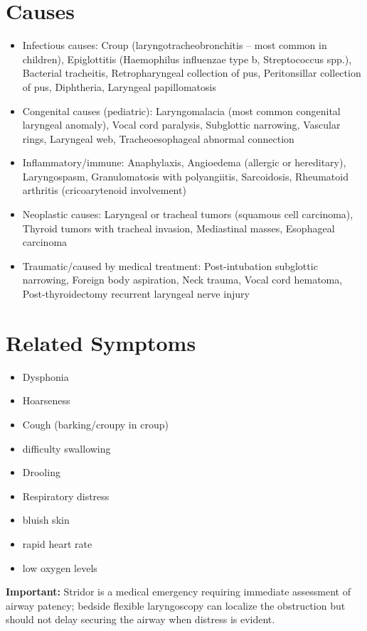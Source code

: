 \section*{Causes}
\begin{itemize}
  \item Infectious causes: Croup (laryngotracheobronchitis -- most common in children), Epiglottitis (Haemophilus influenzae type b, Streptococcus spp.), Bacterial tracheitis, Retropharyngeal collection of pus, Peritonsillar collection of pus, Diphtheria, Laryngeal papillomatosis
  \item Congenital causes (pediatric): Laryngomalacia (most common congenital laryngeal anomaly), Vocal cord paralysis, Subglottic narrowing, Vascular rings, Laryngeal web, Tracheoesophageal abnormal connection
  \item Inflammatory/immune: Anaphylaxis, Angioedema (allergic or hereditary), Laryngospasm, Granulomatosis with polyangiitis, Sarcoidosis, Rheumatoid arthritis (cricoarytenoid involvement)
  \item Neoplastic causes: Laryngeal or tracheal tumors (squamous cell carcinoma), Thyroid tumors with tracheal invasion, Mediastinal masses, Esophageal carcinoma
  \item Traumatic/caused by medical treatment: Post-intubation subglottic narrowing, Foreign body aspiration, Neck trauma, Vocal cord hematoma, Post-thyroidectomy recurrent laryngeal nerve injury
\end{itemize}

\section*{Related Symptoms}
\begin{itemize}
  \item Dysphonia
  \item Hoarseness
  \item Cough (barking/croupy in croup)
  \item difficulty swallowing
  \item Drooling
  \item Respiratory distress
  \item bluish skin
  \item rapid heart rate
  \item low oxygen levels
\end{itemize}
\textbf{Important:} Stridor is a medical emergency requiring immediate assessment of airway patency; bedside flexible laryngoscopy can localize the obstruction but should not delay securing the airway when distress is evident.

